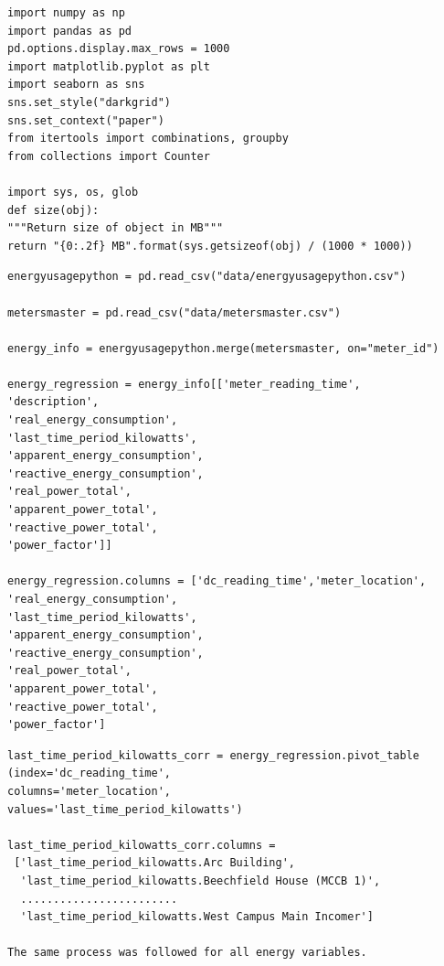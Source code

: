 \documentclass[12pt]{scrartcl}
\begin{document}
\begin{lstlisting}[frame=single,basicstyle=\footnotesize\ttfamily,
  caption={Python - Set Up and Configuration},label={list:[Python - Set up and Configuration]}]
import numpy as np
import pandas as pd
pd.options.display.max_rows = 1000
import matplotlib.pyplot as plt
import seaborn as sns
sns.set_style("darkgrid")
sns.set_context("paper")
from itertools import combinations, groupby
from collections import Counter

import sys, os, glob
def size(obj):
"""Return size of object in MB"""
return "{0:.2f} MB".format(sys.getsizeof(obj) / (1000 * 1000))
\end{lstlisting}

\begin{lstlisting}[frame=single,basicstyle=\footnotesize\ttfamily,
  caption={Python - Import and Cleanse Energy Data},label={list:[Import and Merge Data]}]
energyusagepython = pd.read_csv("data/energyusagepython.csv")

metersmaster = pd.read_csv("data/metersmaster.csv")

energy_info = energyusagepython.merge(metersmaster, on="meter_id")

energy_regression = energy_info[['meter_reading_time',
'description',
'real_energy_consumption',
'last_time_period_kilowatts',
'apparent_energy_consumption',
'reactive_energy_consumption',
'real_power_total',
'apparent_power_total',
'reactive_power_total',
'power_factor']]

energy_regression.columns = ['dc_reading_time','meter_location',
'real_energy_consumption',
'last_time_period_kilowatts',
'apparent_energy_consumption',
'reactive_energy_consumption',
'real_power_total',
'apparent_power_total',
'reactive_power_total',
'power_factor']

\end{lstlisting}

\begin{lstlisting}[frame=single,basicstyle=\footnotesize\ttfamily,
  caption={Python - Pivot Data around the meter reading time},label={list:[Pivot Data around the meter reading time]}]
last_time_period_kilowatts_corr = energy_regression.pivot_table
(index='dc_reading_time',
columns='meter_location',
values='last_time_period_kilowatts')

last_time_period_kilowatts_corr.columns =
 ['last_time_period_kilowatts.Arc Building',
  'last_time_period_kilowatts.Beechfield House (MCCB 1)',
  ........................
  'last_time_period_kilowatts.West Campus Main Incomer']
    
The same process was followed for all energy variables.

\end{lstlisting}
\end{document}
